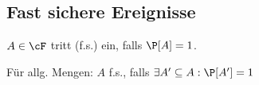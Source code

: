 \subsection{Fast sichere Ereignisse}
\shortdefinition $A \in \cF$ tritt  (f.s.) ein, falls $\P[A] = 1$.

\shortremark Für allg. Mengen: $A$ f.s., falls $\exists A' \subseteq A : \P[A'] = 1$
